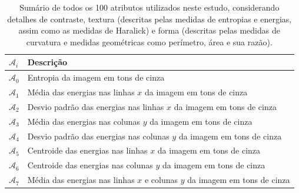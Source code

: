 \begin{table}
  \begin{center}
  \caption{\label{tab:atributos}Sumário de todos os 100 atributos utilizados
    neste estudo, considerando detalhes de contraste, textura (descritas pelas
    medidas de entropias e energias, assim como as medidas de Haralick) e forma
    (descritas pelas medidas de curvatura e medidas geométricas como perímetro,
    área e sua razão).}

  \begin{tabular}{l|l}
    \hline \hline
    \textbf{$\mathcal{A}_i$} & \textbf{Descrição} \\
    \hline

    $\mathcal{A}_0$ & 
    Entropia da imagem em tons de cinza \\
    
    $\mathcal{A}_1$ & 
    Média das energias nas linhas $x$ da imagem em tons de cinza \\

    $\mathcal{A}_2$ &
    Desvio padrão das energias nas linhas $x$ da imagem em tons de cinza \\

    $\mathcal{A}_3$ &
    Média das energias nas colunas $y$ da imagem em tons de cinza \\

    $\mathcal{A}_4$ &
    Desvio padrão das energias nas colunas $y$ da imagem em tons de cinza \\

    $\mathcal{A}_5$ &
    Centroide das energias nas linhas $x$ da imagem em tons de cinza \\

    $\mathcal{A}_6$ &
    Centroide das energias nas colunas $y$ da imagem em tons de cinza \\

    $\mathcal{A}_7$ &
    Média das energias nas linhas $x$ e colunas $y$ da imagem em tons de cinza \\


\end{tabular}
\end{center}
\end{table}
